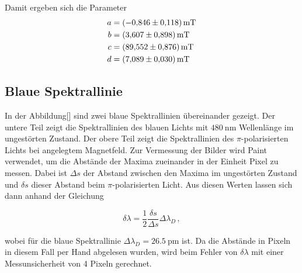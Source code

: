 Damit ergeben sich die Parameter 
\begin{align*}
    a &= \SI{-0.846(118)}{\milli\tesla} \\
    b &= \SI{3.607 (898)}{\milli\tesla} \\
    c &= \SI{89.552(876)}{\milli\tesla} \\
    d &= \SI{7.089 (030)}{\milli\tesla}
\end{align*}

\subsection{Blaue Spektrallinie}

In der Abbildung[] sind zwei blaue Spektrallinien übereinander gezeigt. Der untere Teil zeigt die Spektrallinien des blauen Lichts mit 
$\SI{480}{\nano\metre}$ Wellenlänge im ungestörten Zustand. Der obere Teil zeigt die Spektrallinien des $\pi$-polarisierten Lichts bei 
angelegtem Magnetfeld. Zur Vermessung der Bilder wird Paint verwendet, um die Abstände der Maxima zueinander in der Einheit Pixel zu messen. 
Dabei ist $\Delta s$ der Abstand zwischen den Maxima im ungestörten Zustand und $\delta s$ dieser Abstand beim $\pi$-polarisierten Licht. 
Aus diesen Werten lassen sich dann anhand der Gleichung 

\begin{equation}
    \delta\lambda = \frac{1}2 \frac{\delta s}{\Delta s} \Delta\lambda_D\,,
\end{equation}

wobei für die blaue Spektrallinie $\Delta\lambda_D = \SI{26.5}{\pico\metre}$ ist. Da die Abstände in Pixeln in diesem Fall per Hand abgelesen 
wurden, wird beim Fehler von $\delta\lambda$ mit einer Messunsicherheit von 4 Pixeln gerechnet. \\

